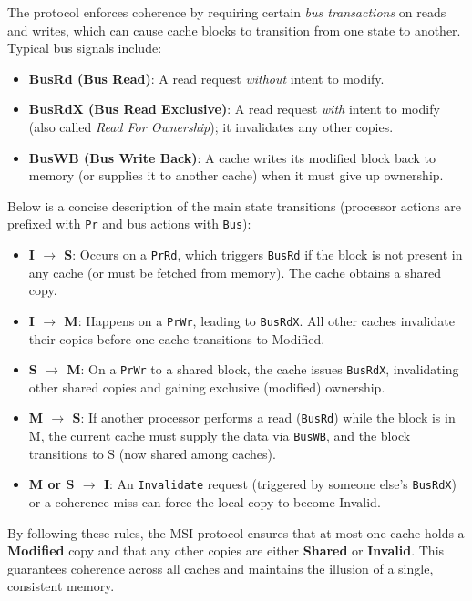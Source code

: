 The protocol enforces coherence by requiring certain \emph{bus transactions} on
reads and writes, which can cause cache blocks to transition from one state
to another. Typical bus signals include:
\begin{itemize}
  \item \textbf{BusRd (Bus Read)}: A read request \emph{without} intent to modify.
  \item \textbf{BusRdX (Bus Read Exclusive)}: A read request \emph{with} intent to modify
        (also called \emph{Read For Ownership}); it invalidates any other copies.
  \item \textbf{BusWB (Bus Write Back)}: A cache writes its modified block back to memory
        (or supplies it to another cache) when it must give up ownership.
\end{itemize}

Below is a concise description of the main state transitions (processor actions are
prefixed with \texttt{Pr} and bus actions with \texttt{Bus}):

\begin{itemize}
  \item \textbf{I $\rightarrow$ S}:
    Occurs on a \texttt{PrRd}, which triggers \texttt{BusRd} if the block is not present
    in any cache (or must be fetched from memory). The cache obtains a shared copy.
  \item \textbf{I $\rightarrow$ M}:
    Happens on a \texttt{PrWr}, leading to \texttt{BusRdX}. All other caches invalidate
    their copies before one cache transitions to Modified.
  \item \textbf{S $\rightarrow$ M}:
    On a \texttt{PrWr} to a shared block, the cache issues \texttt{BusRdX}, invalidating
    other shared copies and gaining exclusive (modified) ownership.
  \item \textbf{M $\rightarrow$ S}:
    If another processor performs a read (\texttt{BusRd}) while the block is in M,
    the current cache must supply the data via \texttt{BusWB}, and the block transitions
    to S (now shared among caches).
  \item \textbf{M or S $\rightarrow$ I}:
    An \texttt{Invalidate} request (triggered by someone else's \texttt{BusRdX}) or a
    coherence miss can force the local copy to become Invalid.
\end{itemize}

By following these rules, the MSI protocol ensures that at most one cache
holds a \textbf{Modified} copy and that any other copies are either \textbf{Shared} or
\textbf{Invalid}. This guarantees coherence across all caches and maintains
the illusion of a single, consistent memory.